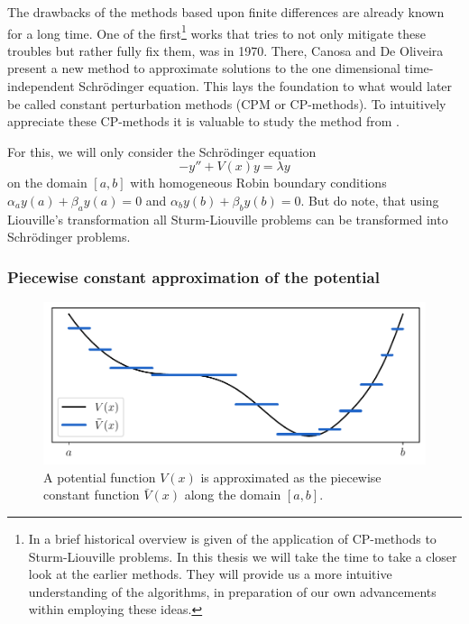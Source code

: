 The drawbacks of the methods based upon finite differences are already known for a long time. One of the first\footnote{In \cite{ledoux_solving_2010} a brief historical overview is given of the application of CP-methods to Sturm-Liouville problems. In this thesis we will take the time to take a closer look at the earlier methods. They will provide us a more intuitive understanding of the algorithms, in preparation of our own advancements within employing these ideas.} works that tries to not only mitigate these troubles but rather fully fix them, was \cite{canosa_new_1970} in 1970. There, Canosa and De Oliveira present a new method to approximate solutions to the one dimensional time-independent Schrödinger equation. This lays the foundation to what would later be called constant perturbation methods (CPM or CP-methods). To intuitively appreciate these CP-methods it is valuable to study the method from \cite{canosa_new_1970}.

For this, we will only consider the Schrödinger equation
\begin{equation}\label{equ:c2_cpm_schrodinger}
    - y'' + V(x) y = \lambda y
\end{equation}
on the domain $[a, b]$ with homogeneous Robin boundary conditions $\alpha_a y(a) + \beta_a y(a) = 0$ and $\alpha_b y(b) + \beta_b y(b) = 0$. But do note, that using Liouville's transformation all Sturm-Liouville problems can be transformed into Schrödinger problems.

\subsubsection{Piecewise constant approximation of the potential}

\begin{figure}
    \begin{center}
        \includegraphics[width=\textwidth]{img/chapter2/cpm_constant_approx.pdf}
        \caption{A potential function $V(x)$ is approximated as the piecewise constant function $\bar{V}(x)$ along the domain $[a, b]$.}
        \label{fig:c2_cpm_constant_approx}
    \end{center}
\end{figure}

